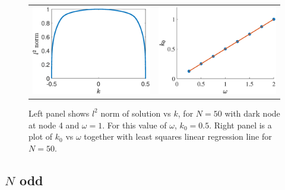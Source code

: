 \documentclass[12pt,reqno]{amsart}
\begin{document}
\begin{figure}[H]
\begin{center}
\begin{tabular}{cc}
\includegraphics[width=7.5cm]{evenbif50.eps} &
\includegraphics[width=7.5cm]{k0vsomega.eps}
\end{tabular}
\end{center}
\caption{Left panel shows $l^2$ norm of solution vs $k$, for $N = 50$ with dark node at node 4 and $\omega = 1$. For this value of $\omega$, $k_0 = 0.5$. Right panel is a plot of $k_0$ vs $\omega$ together with least squares linear regression line for $N = 50$.}
\label{fig:evenbif}
\end{figure}

\subsection{\texorpdfstring{$N$}{N} odd}\label{sec:Nodd}
\end{document}
